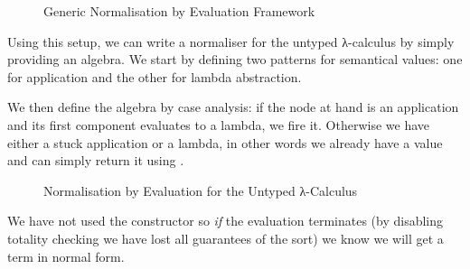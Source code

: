 \begin{figure}[h]
\caption{Generic Normalisation by Evaluation Framework}
\end{figure}

Using this setup, we can write a normaliser for the untyped λ-calculus
by simply providing an algebra. We start by defining two patterns for
semantical values: one for application and the other for lambda abstraction.


We then define the algebra by case analysis: if the node at hand is an
application and its first component evaluates to a lambda, we fire it.
Otherwise we have either a stuck application or a lambda, in other words
we already have a value and can simply return it using .

\begin{figure}[h]
\caption{Normalisation by Evaluation for the Untyped λ-Calculus}
\end{figure}

We have not used the  constructor so \emph{if} the evaluation terminates
(by disabling totality checking we have lost all guarantees of the sort) we know
we will get a term in normal form.
